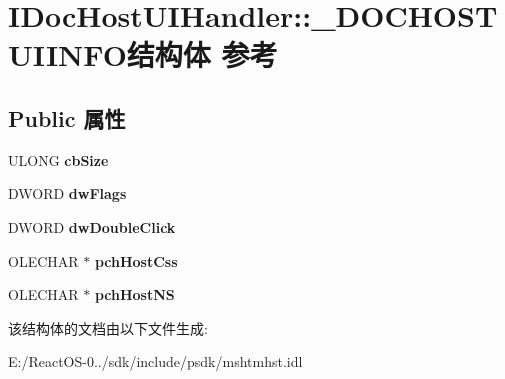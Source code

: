 \hypertarget{struct_i_doc_host_u_i_handler_1_1___d_o_c_h_o_s_t_u_i_i_n_f_o}{}\section{I\+Doc\+Host\+U\+I\+Handler\+:\+:\+\_\+\+D\+O\+C\+H\+O\+S\+T\+U\+I\+I\+N\+F\+O结构体 参考}
\label{struct_i_doc_host_u_i_handler_1_1___d_o_c_h_o_s_t_u_i_i_n_f_o}
\subsection*{Public 属性}
\begin{DoxyCompactItemize}
\item 
\mbox{\label{struct_i_doc_host_u_i_handler_1_1___d_o_c_h_o_s_t_u_i_i_n_f_o_ae75a5ae7f6328a5d7f05bc13aae24539}} 
U\+L\+O\+NG {\bfseries cb\+Size}
\item 
\mbox{\label{struct_i_doc_host_u_i_handler_1_1___d_o_c_h_o_s_t_u_i_i_n_f_o_aa5dea3834689d4ae02445774bf6de930}} 
D\+W\+O\+RD {\bfseries dw\+Flags}
\item 
\mbox{\label{struct_i_doc_host_u_i_handler_1_1___d_o_c_h_o_s_t_u_i_i_n_f_o_aabc87a29370e03bf08fb1c09dbcd30c1}} 
D\+W\+O\+RD {\bfseries dw\+Double\+Click}
\item 
\mbox{\label{struct_i_doc_host_u_i_handler_1_1___d_o_c_h_o_s_t_u_i_i_n_f_o_a1a85f099e475bbb2d5ac59d68570aa69}} 
O\+L\+E\+C\+H\+AR $\ast$ {\bfseries pch\+Host\+Css}
\item 
\mbox{\label{struct_i_doc_host_u_i_handler_1_1___d_o_c_h_o_s_t_u_i_i_n_f_o_a9eb3e265d7915e492dd2d69cef8fbf3e}} 
O\+L\+E\+C\+H\+AR $\ast$ {\bfseries pch\+Host\+NS}
\end{DoxyCompactItemize}


该结构体的文档由以下文件生成\+:\begin{DoxyCompactItemize}
\item 
E\+:/\+React\+O\+S-\/0../sdk/include/psdk/mshtmhst.\+idl\end{DoxyCompactItemize}
